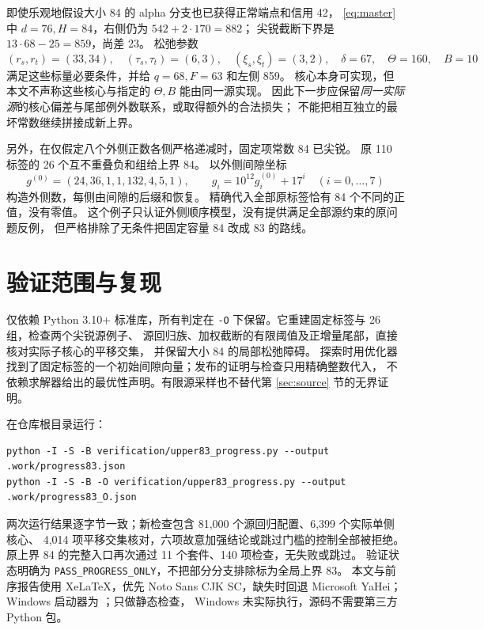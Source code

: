\documentclass[11pt,a4paper]{article}
\begin{document}
即使乐观地假设大小 84 的 alpha 分支也已获得正常端点和信用 42，
\eqref{eq:master} 中 $d=76,H=84$，右侧仍为 $542+2\cdot170=882$；
尖锐截断下界是 $13\cdot68-25=859$，尚差 23。
松弛参数
\[
(r_s,r_t)=(33,34),\quad(\tau_s,\tau_t)=(6,3),\quad
(\xi_s,\xi_t)=(3,2),\quad\delta=67,\quad\Theta=160,\quad B=10
\]
满足这些标量必要条件，并给 $q=68,F=63$ 和左侧 859。
核心本身可实现，但本文不声称这些核心与指定的 $\Theta,B$ 能由同一源实现。
因此下一步应保留\emph{同一实际源}的核心偏差与尾部例外数联系，或取得额外的合法损失；
不能把相互独立的最坏常数继续拼接成新上界。

另外，在仅假定八个外侧正数各侧严格递减时，固定项常数 84 已尖锐。
原 110 标签的 26 个互不重叠负和组给上界 84。
以外侧间隙坐标
\[g^{(0)}=(24,36,1,1,132,4,5,1),\qquad
g_i=10^{12}g_i^{(0)}+17^i\quad(i=0,\ldots,7)
\]
构造外侧数，每侧由间隙的后缀和恢复。
精确代入全部原标签恰有 84 个不同的正值，没有零值。
这个例子只认证外侧顺序模型，没有提供满足全部源约束的原问题反例，
但严格排除了无条件把固定容量 84 改成 83 的路线。

\section{验证范围与复现}\label{sec:verify}
 仅依赖 Python 3.10+ 标准库，所有判定在
\texttt{-O} 下保留。它重建固定标签与 26 组，检查两个尖锐源例子、
源回归族、加权截断的有限阈值及正增量尾部，直接核对实际子核心的平移交集，
并保留大小 84 的局部松弛障碍。
探索时用优化器找到了固定标签的一个初始间隙向量；发布的证明与检查只用精确整数代入，
不依赖求解器给出的最优性声明。有限源采样也不替代第 \ref{sec:source} 节的无界证明。

在仓库根目录运行：
\begin{verbatim}
python -I -S -B verification/upper83_progress.py --output .work/progress83.json
python -I -S -B -O verification/upper83_progress.py --output .work/progress83_O.json
\end{verbatim}
两次运行结果逐字节一致；新检查包含 81,000 个源回归配置、6,399 个实际单侧核心、
4,014 项平移交集核对，六项故意加强结论或跳过门槛的控制全部被拒绝。
原上界 84 的完整入口再次通过 11 个套件、140 项检查，无失败或跳过。
验证状态明确为 \texttt{PASS\_PROGRESS\_ONLY}，不把部分分支排除标为全局上界 83。
本文与前序报告使用 XeLaTeX，优先 Noto Sans CJK SC，缺失时回退 Microsoft YaHei；
Windows 启动器为 ；只做静态检查，
Windows 未实际执行，源码不需要第三方 Python 包。
\end{document}
